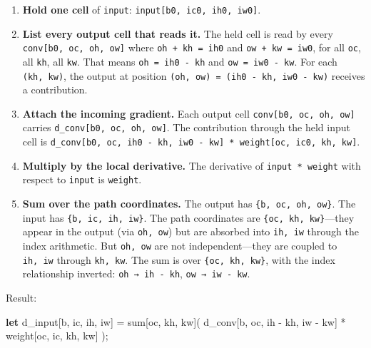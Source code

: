 \documentclass[11pt,titlepage]{article}
\newenvironment{Shaded}{}{}
\newcommand{\KeywordTok}[1]{\textcolor[rgb]{0.00,0.44,0.13}{\textbf{#1}}}
\newcommand{\NormalTok}[1]{#1}
\newcommand{\OperatorTok}[1]{\textcolor[rgb]{0.40,0.40,0.40}{#1}}
\providecommand{\tightlist}{%
  \setlength{\itemsep}{0pt}\setlength{\parskip}{0pt}}
\begin{document}
\begin{enumerate}
\def\labelenumi{\arabic{enumi}.}
\tightlist
\item
  \textbf{Hold one cell} of \texttt{input}:
  \texttt{input{[}b0,\ ic0,\ ih0,\ iw0{]}}.
\item
  \textbf{List every output cell that reads it.} The held cell is read
  by every \texttt{conv{[}b0,\ oc,\ oh,\ ow{]}} where
  \texttt{oh\ +\ kh\ =\ ih0} and \texttt{ow\ +\ kw\ =\ iw0}, for all
  \texttt{oc}, all \texttt{kh}, all \texttt{kw}. That means
  \texttt{oh\ =\ ih0\ -\ kh} and \texttt{ow\ =\ iw0\ -\ kw}. For each
  \texttt{(kh,\ kw)}, the output at position
  \texttt{(oh,\ ow)\ =\ (ih0\ -\ kh,\ iw0\ -\ kw)} receives a
  contribution.
\item
  \textbf{Attach the incoming gradient.} Each output cell
  \texttt{conv{[}b0,\ oc,\ oh,\ ow{]}} carries
  \texttt{d\_conv{[}b0,\ oc,\ oh,\ ow{]}}. The contribution through the
  held input cell is
  \texttt{d\_conv{[}b0,\ oc,\ ih0\ -\ kh,\ iw0\ -\ kw{]}\ *\ weight{[}oc,\ ic0,\ kh,\ kw{]}}.
\item
  \textbf{Multiply by the local derivative.} The derivative of
  \texttt{input\ *\ weight} with respect to \texttt{input} is
  \texttt{weight}.
\item
  \textbf{Sum over the path coordinates.} The output has
  \texttt{\{b,\ oc,\ oh,\ ow\}}. The input has
  \texttt{\{b,\ ic,\ ih,\ iw\}}. The path coordinates are
  \texttt{\{oc,\ kh,\ kw\}}---they appear in the output (via
  \texttt{oh,\ ow}) but are absorbed into \texttt{ih,\ iw} through the
  index arithmetic. But \texttt{oh,\ ow} are not independent---they are
  coupled to \texttt{ih,\ iw} through \texttt{kh,\ kw}. The sum is over
  \texttt{\{oc,\ kh,\ kw\}}, with the index relationship inverted:
  \texttt{oh\ →\ ih\ -\ kh}, \texttt{ow\ →\ iw\ -\ kw}.
\end{enumerate}

Result:

\begin{Shaded}
\begin{Highlighting}[]
\KeywordTok{let}\NormalTok{ d_input}\OperatorTok{[}\NormalTok{b, ic, ih, iw}\OperatorTok{]}\NormalTok{ = sum}\OperatorTok{[}\NormalTok{oc, kh, kw}\OperatorTok{]}\NormalTok{(}
\NormalTok{    d_conv}\OperatorTok{[}\NormalTok{b, oc, ih - kh, iw - kw}\OperatorTok{]}\NormalTok{ * weight}\OperatorTok{[}\NormalTok{oc, ic, kh, kw}\OperatorTok{]}
\NormalTok{);}
\end{Highlighting}
\end{Shaded}
\end{document}
